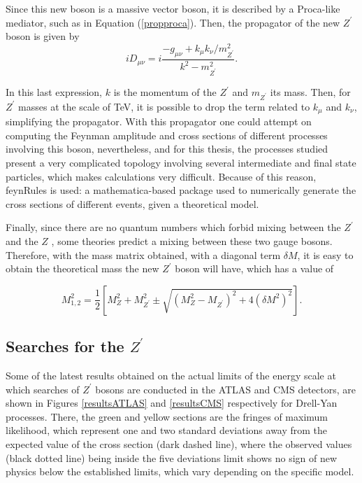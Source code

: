 Since this new boson is a massive vector boson, it is described by a Proca-like mediator, such as in Equation (\ref{propproca}). Then, the propagator of the new $Z^{\prime}$ boson is given by
\begin{equation*}
    iD_{\mu\nu} = i\dfrac{-g_{\mu\nu} + k_{\mu}k_{\nu}/m_{Z^{\prime}}^2}{k^2 - m_{Z^{\prime}}^2}.
\end{equation*}

In this last expression, $k$ is the momentum of the $Z^{\prime}$ and $m_{Z^{\prime}}$ its mass. Then, for $Z^{\prime}$ masses at the scale of TeV, it is possible to drop the term related to $k_{\mu}$ and $k_{\nu}$, simplifying the propagator. With this propagator one could attempt on computing the Feynman amplitude and cross sections of different processes involving this boson, nevertheless, and for this thesis, the processes studied present a very complicated topology involving several intermediate and final state particles, which makes calculations very difficult. Because of this reason, feynRules is used: a mathematica-based package used to numerically generate the cross sections of different events, given a theoretical model.

Finally, since there are no quantum numbers which forbid mixing between the $Z^{\prime}$ and the $Z$ \cite{Leike}, some theories predict a mixing between these two gauge bosons. Therefore, with the mass matrix obtained, with a diagonal term $\delta M$, it is easy to obtain the theoretical mass the new $Z^{\prime}$ boson will have, which has a value of

\begin{equation*}
    M_{1,2}^2 = \dfrac{1}{2}\left[M_Z^2 + M_{Z^{\prime}}^2 \pm \sqrt{(M_Z^2 - M_{Z^{\prime}})^2 + 4(\delta M^2)^2}\right].
\end{equation*}

\subsection{Searches for the $Z^{\prime}$} \label{ssec:searcheszp}

Some of the latest results obtained on the actual limits of the energy scale at which searches of $Z^{\prime}$ bosons are conducted in the ATLAS and CMS detectors, are shown in Figures \ref{resultsATLAS} and \ref{resultsCMS} respectively for Drell-Yan processes. There, the green and yellow sections are the fringes of maximum likelihood, which represent one and two standard deviations away from the expected value of the cross section (dark dashed line), where the observed values (black dotted line) being inside the five deviations limit shows no sign of new physics below the established limits, which vary depending on the specific model. 

